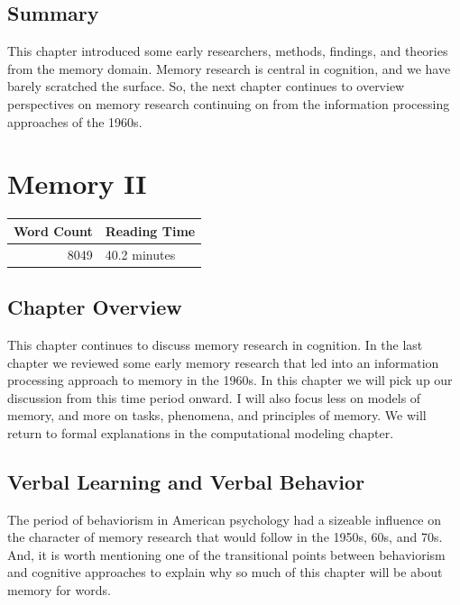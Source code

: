 \documentclass[
  oneside,
  12pt]{crumpbook}
\begin{document}
\hypertarget{summary-2}{%
\section{Summary}\label{summary-2}}

This chapter introduced some early researchers, methods, findings, and theories from the memory domain. Memory research is central in cognition, and we have barely scratched the surface. So, the next chapter continues to overview perspectives on memory research continuing on from the information processing approaches of the 1960s.

\hypertarget{memory-ii}{%
\chapter{Memory II}\label{memory-ii}}

\begin{tabular}{r|l}
\hline
Word Count & Reading Time\\
\hline
8049 & 40.2 minutes\\
\hline
\end{tabular}

\hypertarget{chapter-overview-6}{%
\section{Chapter Overview}\label{chapter-overview-6}}

This chapter continues to discuss memory research in cognition. In the last chapter we reviewed some early memory research that led into an information processing approach to memory in the 1960s. In this chapter we will pick up our discussion from this time period onward. I will also focus less on models of memory, and more on tasks, phenomena, and principles of memory. We will return to formal explanations in the computational modeling chapter.

\hypertarget{verbal-learning-and-verbal-behavior}{%
\section{Verbal Learning and Verbal Behavior}\label{verbal-learning-and-verbal-behavior}}

The period of behaviorism in American psychology had a sizeable influence on the character of memory research that would follow in the 1950s, 60s, and 70s. And, it is worth mentioning one of the transitional points between behaviorism and cognitive approaches to explain why so much of this chapter will be about memory for words.
\end{document}
